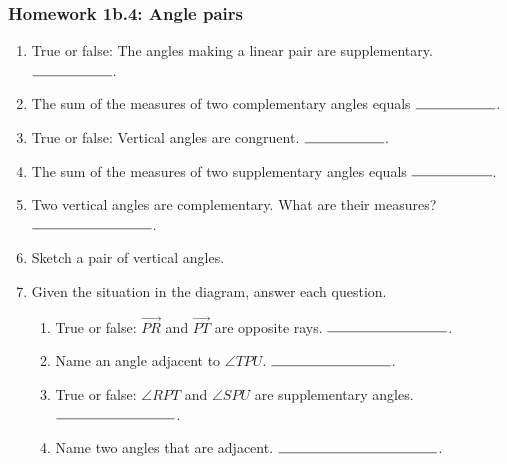 \documentclass[12pt, oneside]{article}
\begin{document}
\subsubsection*{Homework 1b.4: Angle pairs} %
  \vspace{0.5cm}
  \begin{enumerate}

    \item True or false: The angles making a linear pair are supplementary. $\rule{2cm}{0.15mm}$. \bigskip
    \item The sum of the measures of two complementary angles equals $\rule{2cm}{0.15mm}$. \bigskip
    \item True or false: Vertical angles are congruent. $\rule{2cm}{0.15mm}$. \bigskip
    \item The sum of the measures of two supplementary angles equals $\rule{2cm}{0.15mm}$. \bigskip
    \item Two vertical angles are complementary. What are their measures? $\rule{3cm}{0.15mm}$. \bigskip
    \item Sketch a pair of vertical angles. \vspace{3cm}

    \item Given the situation in the diagram, answer each question. \vspace{1cm}
      \begin{flushright}
      \end{flushright}
    \begin{enumerate}
      \item True or false: $\overrightarrow{PR}$ and $\overrightarrow{PT}$ are opposite rays. $\rule{3cm}{0.15mm}$. \bigskip
      \item Name an angle adjacent to $\angle TPU$. $\rule{3cm}{0.15mm}$. \bigskip
      \item True or false: $\angle RPT$ and $\angle SPU$ are supplementary angles. $\rule{3cm}{0.15mm}$. \bigskip
      \item Name two angles that are adjacent. $\rule{4cm}{0.15mm}$. \bigskip
    \end{enumerate}


\end{enumerate}
\end{document}
